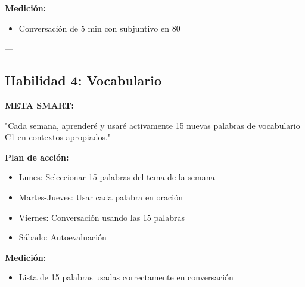 \documentclass[a4paper,11pt]{article}
\begin{document}
\vspace{0.2cm}

\textbf{Medición:}

\begin{itemize}

  \item [ ] Conversación de 5 min con subjuntivo en 80%

\end{itemize}

\vspace{0.2cm}

---

\vspace{0.2cm}

\subsection{Habilidad 4: Vocabulario}

\vspace{0.2cm}

\textbf{META SMART:}

"Cada semana, aprenderé y usaré activamente 15 nuevas palabras de vocabulario C1 en contextos apropiados."

\vspace{0.2cm}

\textbf{Plan de acción:}

\begin{itemize}

  \item Lunes: Seleccionar 15 palabras del tema de la semana

  \item Martes-Jueves: Usar cada palabra en oración

  \item Viernes: Conversación usando las 15 palabras

  \item Sábado: Autoevaluación

\end{itemize}

\vspace{0.2cm}

\textbf{Medición:}

\begin{itemize}

  \item [ ] Lista de 15 palabras usadas correctamente en conversación

\end{itemize}
\end{document}
